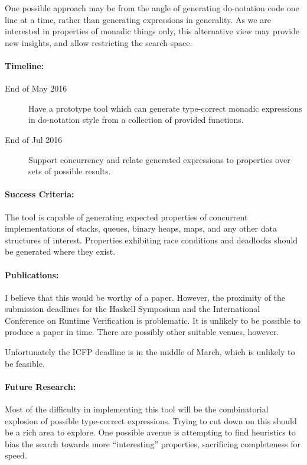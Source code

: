 One possible approach may be from the angle of generating do-notation
code one line at a time, rather than generating expressions in
generality. As we are interested in properties of monadic things only,
this alternative view may provide new insights, and allow restricting
the search space.

\paragraph{Timeline:}

\begin{description}
\item[End of May 2016] Have a prototype tool which can generate
  type-correct monadic expressions in do-notation style from a
  collection of provided functions.

\item[End of Jul 2016] Support concurrency and relate generated
  expressions to properties over sets of possible results.
\end{description}

\paragraph{Success Criteria:}

The tool is capable of generating expected properties of concurrent
implementations of stacks, queues, binary heaps, maps, and any other
data structures of interest. Properties exhibiting race conditions and
deadlocks should be generated where they exist.

\paragraph{Publications:}

I believe that this would be worthy of a paper. However, the proximity
of the submission deadlines for the Haskell Symposium and the
International Conference on Runtime Verification is problematic. It is
unlikely to be possible to produce a paper in time. There are possibly
other suitable venues, however.

Unfortunately the ICFP deadline is in the middle of March, which is
unlikely to be feasible.

\paragraph{Future Research:}

Most of the difficulty in implementing this tool will be the
combinatorial explosion of possible type-correct expressions. Trying
to cut down on this should be a rich area to explore. One possible
avenue is attempting to find heuristics to bias the search towards
more ``interesting'' properties, sacrificing completeness for speed.

